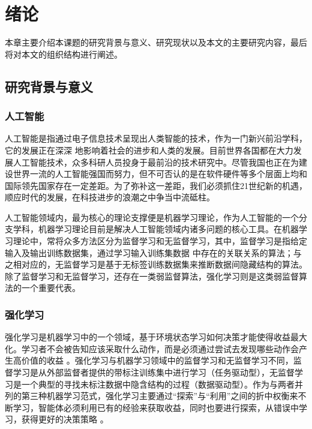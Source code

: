 
\chapter{绪论}\label{chap:intro}

本章主要介绍本课题的研究背景与意义、研究现状以及本文的主要研究内容，最后将对本文的组织结构进行阐述。

\section{研究背景与意义}

\subsection{人工智能}

人工智能是指通过电子信息技术呈现出人类智能的技术，作为一门新兴前沿学科，它的发展正在深深 地影响着社会的进步和人类的发展。目前世界各国都在大力发展人工智能技术，众多科研人员投身于最前沿的技术研究中。尽管我国也正在为建设世界一流的人工智能强国而努力，但不可否认的是在软件硬件等多个层面上均和国际领先国家存在一定差距。为了弥补这一差距，我们必须抓住21世纪新的机遇，顺应时代的发展，在科技进步的浪潮之中争当中流砥柱。

人工智能领域内，最为核心的理论支撑便是机器学习理论，作为人工智能的一个分支学科，机器学习理论目前是解决人工智能领域内诸多问题的核心工具。在机器学习理论中，常将众多方法区分为监督学习和无监督学习\cite{goodfellow2016deep}，其中，监督学习是指给定输入及输出训练数据集，通过学习输入训练集数据 中存在的关联关系的算法；与之相对应的，无监督学习是基于无标签训练数据集来推断数据间隐藏结构的算法\cite{goodfellow2016deep}\cite{bishop2006pattern}\cite{2012statsmethods}。除了监督学习和无监督学习，还存在一类弱监督算法，强化学习则是这类弱监督算法的一个重要代表。

\subsection{强化学习}

强化学习是机器学习中的一个领域，基于环境状态学习如何决策才能使得收益最大化。学习者不会被告知应该采取什么动作，而是必须通过尝试去发现哪些动作会产生高价值的收益 \cite{sutton2018reinforcement}。强化学习与机器学习领域中的监督学习和无监督学习不同，监督学习是从外部监督者提供的带标注训练集中进行学习（任务驱动型），无监督学习是一个典型的寻找未标注数据中隐含结构的过程（数据驱动型）。作为与两者并列的第三种机器学习范式，强化学习主要通过“探索”与“利用”之间的折中权衡来不断学习，智能体必须利用已有的经验来获取收益，同时也要进行探索，从错误中学习，获得更好的决策策略 \cite{kaelbling1996reinforcement}。

